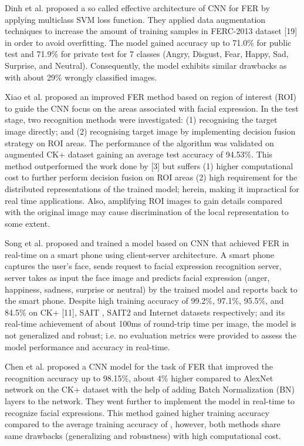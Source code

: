 \documentclass[master]{thesis-uestc}
\begin{document}
Dinh et al.\cite{sang-2017} proposed a so called effective architecture of CNN for FER by applying multiclass SVM loss function. They applied data augmentation techniques to increase the amount of training samples in FERC-2013 dataset [19] in order to avoid overfitting. The model gained accuracy up to 71.0\% for public test and 71.9\% for private test for 7 classes (Angry, Disgust, Fear, Happy, Sad, Surprise, and Neutral). Consequently, the model exhibits similar drawbacks as \cite{Ivanovsky-2017} with about 29\% wrongly classified images.

Xiao et al.\cite{8273609} proposed an improved FER method based on region of interest (ROI) to guide the CNN focus on the areas associated with facial expression. In the test stage, two recognition methods were investigated: (1) recognising the target image directly; and (2) recognising target image by implementing decision fusion strategy on ROI areas.  The performance of the algorithm was validated on augmented CK+ dataset \cite{5543262} gaining an average test accuracy of 94.53\%. This method outperformed the work done by [3] but suffers (1) higher computational cost to further perform decision fusion on ROI areas (2) high requirement for the distributed representations of the trained model; herein, making it impractical for real time applications. Also, amplifying ROI images to gain details compared with the original image may cause discrimination of the local representation to some extent.

Song et al.\cite{6776135} proposed and trained a model based on CNN that achieved FER in real-time on a smart phone using client-server architecture. A smart phone captures the user’s face, sends request to facial expression recognition server, server takes as input the face image and predicts facial expression (anger, happiness, sadness, surprise or neutral) by the trained model and reports back to the smart phone. Despite high training accuracy of 99.2\%, 97.1\%, 95.5\%, and 84.5\% on CK+ [11], SAIT , SAIT2  and Internet  datasets respectively; and its real-time achievement of about 100ms of round-trip time per image, the model is  not generalized and robust; i.e. no evaluation metrics were provided to assess the model performance and accuracy in real-time.

Chen et al.\cite{7988558} proposed a CNN model for the task of FER that improved the recognition accuracy up to 98.15\%, about 4\% higher compared to AlexNet network\cite{Kri12} on the CK+ dataset\cite{5543262} with the help of adding Batch Normalization (BN) layers to the network. They went further to implement the model in real-time to recognize facial expressions. This method gained higher training accuracy compared to the average training accuracy of , however, both methods share same drawbacks (generalizing and robustness) with high computational cost.
\end{document}
